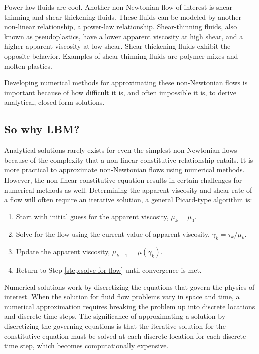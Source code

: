 \documentclass{article}
\begin{document}
Power-law fluids are cool.
Another non-Newtonian flow of interest is shear-thinning and shear-thickening fluids.
These fluids can be modeled by another non-linear relationship, a power-law relationship.
Shear-thinning fluids, also known as pseudoplastics, have a lower apparent viscosity at high shear, and a higher apparent viscosity at low shear.
Shear-thickening fluids exhibit the opposite behavior.
Examples of shear-thinning fluids are polymer mixes and molten plastics.

Developing numerical methods for approximating these non-Newtonian flows is important because of how difficult it is, and often impossible it is, to derive analytical, closed-form solutions.

\subsection{So why LBM?}

Analytical solutions rarely exists for even the simplest non-Newtonian flows because of the complexity that a non-linear constitutive relationship entails.
It is more practical to approximate non-Newtonian flows using numerical methods.
However, the non-linear constitutive equation results in certain challenges for numerical methods as well.
Determining the apparent viscosity and shear rate of a flow will often require an iterative solution, a general Picard-type algorithm is:

\begin{enumerate}
	\item Start with initial guess for the apparent viscosity, $\mu_k = \mu_0$.
	\item \label{step:solve-for-flow} Solve for the flow using the current value of apparent viscosity, $\dot{\gamma}_k = \tau_k / \mu_k$.
	\item Update the apparent viscosity, $\mu_{k+1} = \mu(\dot{\gamma}_k)$.
	\item Return to Step \ref{step:solve-for-flow} until convergence is met.
\end{enumerate}

Numerical solutions work by discretizing the equations that govern the physics of interest.
When the solution for fluid flow problems vary in space and time, a numerical approximation requires breaking the problem up into discrete locations and discrete time steps.
The significance of approximating a solution by discretizing the governing equations is that the iterative solution for the constitutive equation must be solved at each discrete location for each discrete time step, which becomes computationally expensive.
\end{document}

